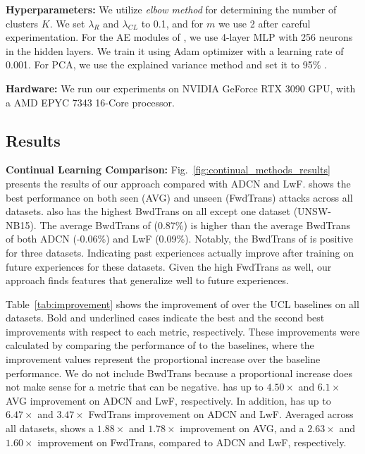 \textbf{Hyperparameters:} %
We utilize \textit{elbow method} \cite{han2011data} for determining the number of clusters $K$. 
We set $\lambda_R$ and $\lambda_{CL}$ to 0.1, and for $m$ we use 2 after careful experimentation. For the AE modules of \Design{}, we use 4-layer MLP with 256 neurons in the hidden layers. We train it using Adam optimizer \cite{kingma2017adammethods} with a learning rate of 0.001. For PCA, we use the explained variance method and set it to 95\% \cite{rios2022incdfm}.

\textbf{Hardware:} We run our experiments on NVIDIA GeForce RTX 3090 GPU, with a AMD EPYC 7343 16-Core processor.

\subsection{Results}

\textbf{Continual Learning Comparison:} Fig.~\ref{fig:continual_methods_results} presents the results of our approach \Design{} compared with ADCN\cite{ashfahani2023unsupervised} and LwF\cite{lwf2019Li}. \Design{} shows the best performance on both seen (AVG) and unseen (FwdTrans) attacks across all datasets. \Design{} also has the highest BwdTrans on all except one dataset (UNSW-NB15). The average BwdTrans of \Design{} (0.87\%) is higher than the average BwdTrans of both ADCN (-0.06\%) and LwF (0.09\%). Notably, the BwdTrans of \Design{} is positive for three datasets. Indicating past experiences actually improve after training on future experiences for these datasets. Given the high FwdTrans as well, our approach finds features that generalize well to future experiences. 

Table~\ref{tab:improvement} shows the improvement of \Design{} over the UCL baselines on all datasets. Bold and underlined cases indicate the best and the second best improvements with respect to each metric, respectively. These improvements were calculated by comparing the performance of \Design{} to the baselines, where the improvement values represent the proportional increase over the baseline performance. We do not include BwdTrans because a proportional increase does not make sense for a metric that can be negative. \Design{} has up to $4.50\times$ and $6.1\times$ AVG improvement on ADCN and LwF, respectively. In addition, \Design{} has up to $6.47\times$ and $3.47\times$ FwdTrans improvement on ADCN and LwF. Averaged across all datasets, \Design{} shows a $1.88\times$ and $1.78\times$ improvement on AVG, and a $2.63\times$ and $1.60\times$ improvement on FwdTrans, compared to ADCN and LwF, respectively. %

